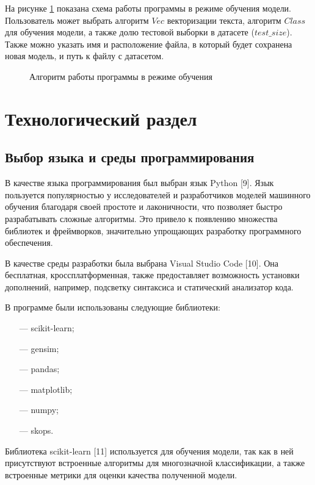 \documentclass[a4paper, 12pt]{article}
\begin{document}
\begin{large}
На рисунке \ref{train} показана схема работы программы в режиме обучения модели.
Пользователь может выбрать алгоритм $Vec$ векторизации текста, алгоритм $Class$ для обучения модели, а также долю тестовой выборки в датасете ($test\_size$).
Также можно указать имя и расположение файла, в который будет сохранена новая модель, и путь к файлу с датасетом.

\newpage

\begin{figure}[h!]
    \captionsetup{justification=centering}
    \caption{Алгоритм работы программы в режиме обучения}
    \label{train}
\end{figure}

\newpage

\section{Технологический раздел}
\subsection{Выбор языка и среды программирования}
В качестве языка программирования был выбран язык Python [9]. 
Язык пользуется популярностью у исследователей и разработчиков моделей машинного обучения благодаря своей простоте и лаконичности, что позволяет быстро разрабатывать сложные алгоритмы. 
Это привело к появлению множества библиотек и фреймворков, значительно упрощающих разработку программного обеспечения.

В качестве среды разработки была выбрана Visual Studio Code [10]. 
Она бесплатная, кроссплатформенная, также предоставляет возможность установки дополнений, например, подсветку синтаксиса и статический анализатор кода.

В программе были использованы следующие библиотеки:
\begin{itemize}
    \item[---] scikit-learn;
    \item[---] gensim;
    \item[---] pandas;
    \item[---] matplotlib;
    \item[---] numpy;
    \item[---] skops.
\end{itemize}
Библиотека scikit-learn [11] используется для обучения модели, так как в ней присутствуют встроенные алгоритмы для многозначной классификации, а также встроенные метрики для оценки качества полученной модели.


\end{large}
\end{document}
